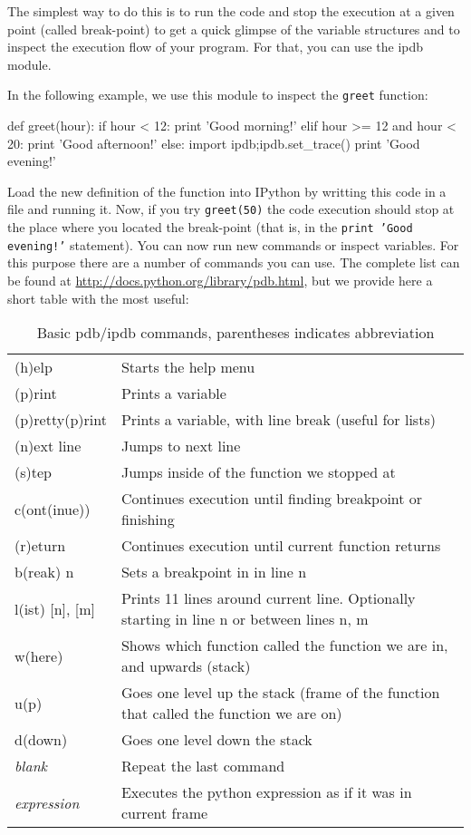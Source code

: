 The simplest way to do this is to run the code and stop the execution at a given point (called break-point) to get a quick glimpse of the variable structures and to inspect the execution flow of your program. For that, you can use the ipdb module. 

In the following example, we use this module to inspect the \texttt{greet} function:

\begin{python}
def greet(hour):
    if hour < 12:
        print 'Good morning!'
    elif hour >= 12 and hour < 20:
        print 'Good afternoon!'
    else:
        import ipdb;ipdb.set_trace()
        print 'Good evening!'
\end{python}

Load the new definition of the function into IPython by writting this code in a file and running it. Now, if you try \texttt{greet(50)} the code execution should stop at the place where you located the break-point (that is, in the \texttt{print 'Good evening!'} statement). You can now run new commands or inspect variables. For this purpose there are a number of commands you can use. The complete list can be found at \url{http://docs.python.org/library/pdb.html}, but we provide here a short table with the most useful: 

\begin{table}[!h]
\begin{center}
\begin{tabular}{|l|l|}
\hline
(h)elp           & Starts the help menu\\
(p)rint          & Prints a variable\\
(p)retty(p)rint	 & Prints a variable, with line break (useful for lists)\\
\hline
(n)ext line      & Jumps to next line\\ 
(s)tep           & Jumps inside of the function we stopped at\\
c(ont(inue))     & Continues execution until finding breakpoint or finishing\\
(r)eturn         & Continues execution until current function returns\\
b(reak) n        & Sets a breakpoint in in line n\\
\hline
l(ist) [n], [m]  & Prints 11 lines around current line. Optionally starting in line n or between lines n, m\\
w(here)          & Shows which function called the function we are in, and upwards (stack\footnotemark)\\
u(p)             & Goes one level up the stack (frame of the function that called the function we are on)\\
d(down)          & Goes one level down the stack\\
\hline
\textit{blank}          & Repeat the last command\\ 
\textit{expression}     & Executes the python expression as if it was in current frame\\
\hline
\end{tabular}
\end{center}
\caption{\label{tb::pdbbasiccommands}Basic pdb/ipdb commands, parentheses indicates abbreviation}
\end{table}

